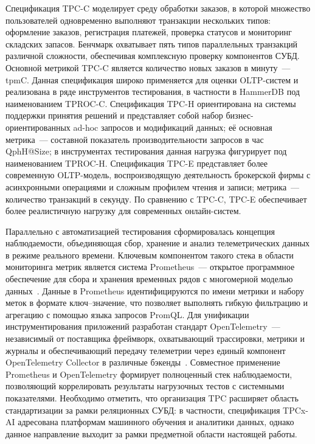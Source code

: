 Спецификация TPC-C моделирует среду обработки заказов, в которой множество пользователей одновременно выполняют транзакции нескольких типов: оформление заказов, регистрация платежей, проверка статусов и мониторинг складских запасов. Бенчмарк охватывает пять типов параллельных транзакций различной сложности, обеспечивая комплексную проверку компонентов СУБД. Основной метрикой TPC-C является количество новых заказов в минуту~--- tpmC. Данная спецификация широко применяется для оценки OLTP-систем и реализована в ряде инструментов тестирования, в частности в HammerDB под наименованием TPROC-C. Спецификация TPC-H ориентирована на системы поддержки принятия решений и представляет собой набор бизнес-ориентированных ad-hoc запросов и модификаций данных; её основная метрика~--- составной показатель производительности запросов в час QphH@Size; в инструментах тестирования данная нагрузка фигурирует под наименованием TPROC-H. Спецификация TPC-E представляет более современную OLTP-модель, воспроизводящую деятельность брокерской фирмы с асинхронными операциями и сложным профилем чтения и записи; метрика~--- количество транзакций в секунду. По сравнению с TPC-C, TPC-E обеспечивает более реалистичную нагрузку для современных онлайн-систем.

Параллельно с автоматизацией тестирования сформировалась концепция наблюдаемости, объединяющая сбор, хранение и анализ телеметрических данных в режиме реального времени. Ключевым компонентом такого стека в области мониторинга метрик является система Prometheus~--- открытое программное обеспечение для сбора и хранения временных рядов с многомерной моделью данных~\cite{prometheus_overview}. Данные в Prometheus идентифицируются по имени метрики и набору меток в формате ключ--значение, что позволяет выполнять гибкую фильтрацию и агрегацию с помощью языка запросов PromQL. Для унификации инструментирования приложений разработан стандарт OpenTelemetry~--- независимый от поставщика фреймворк, охватывающий трассировки, метрики и журналы и обеспечивающий передачу телеметрии через единый компонент OpenTelemetry Collector в различные бэкенды~\cite{opentelemetry}. Совместное применение Prometheus и OpenTelemetry формирует полноценный стек наблюдаемости, позволяющий коррелировать результаты нагрузочных тестов с системными показателями. Необходимо отметить, что организация TPC расширяет область стандартизации за рамки реляционных СУБД: в частности, спецификация TPCx-AI адресована платформам машинного обучения и аналитики данных, однако данное направление выходит за рамки предметной области настоящей работы.

